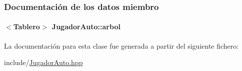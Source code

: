 \subsubsection{Documentación de los datos miembro}
\hypertarget{classJugadorAuto_a0ceb9994f364572f00abf5c490b50319}{
\paragraph[{arbol}]{$<${\bf Tablero}$>$ Jugador\-Auto\-::arbol\hspace{0.3cm}{\ttfamily [private]}}}\label{classJugadorAuto_a0ceb9994f364572f00abf5c490b50319}


La documentación para esta clase fue generada a partir del siguiente fichero\-:\begin{DoxyCompactItemize}
\item 
include/\hyperlink{JugadorAuto_8hpp}{Jugador\-Auto.\-hpp}\end{DoxyCompactItemize}

